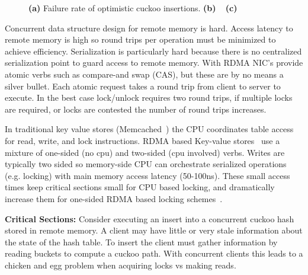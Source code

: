 \begin{figure}[t]
\begin{subfigure}{0.3\linewidth}
    \end{subfigure}
    \vspace{-1em}
    \caption{
    \textbf{(a)} Failure rate of optimistic cuckoo insertions.
    \textbf{(b)} ~
    \textbf{(c)} ~
    }
    \label{fig:problems}
\end{figure}

Concurrent data structure design for remote memory is hard.
Access latency to remote memory is high so round trips per
operation must be minimized to achieve efficiency.
Serialization is particularly hard because there is no
centralized serialization point to guard access to remote
memory. With RDMA NIC's provide atomic verbs such as
compare-and swap (CAS), but these are by no means a silver
bullet.  Each atomic request takes a round trip from client
to server to execute. In the best case lock/unlock requires
two round trips, if multiple locks are required, or locks
are contested the number of round trips increases.

In traditional key value stores (Memcached~\cite{memcached})
the CPU coordinates table access for read, write, and lock
instructions. RDMA based Key-value
stores~\cite{herd,erpc,pilaf} use a mixture of one-sided (no
cpu) and two-sided (cpu involved) verbs.  Writes are
typically two sided so memory-side CPU can orchestrate
serialized operations (e.g. locking) with main memory access
latency (50-100ns). These small access times keep critical
sections small for CPU based locking, and dramatically
increase them for one-sided RDMA based locking
schemes~\cite{clover, sherman}.

\textbf{Critical Sections:} Consider executing an insert
into a concurrent cuckoo hash stored in remote memory. A
client may have little or very stale information about the
state of the hash table. To insert the client must gather
information by reading buckets to compute a cuckoo path.
With concurrent clients this leads to a chicken and egg
problem when acquiring locks vs making reads.

